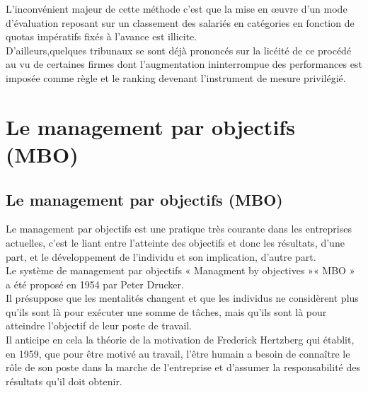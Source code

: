 L’inconvénient majeur de cette méthode c’est que la mise en œuvre d'un mode d'évaluation reposant sur un classement des salariés en catégories en fonction de quotas impératifs fixés à l'avance est illicite.\\

D'ailleurs,quelques tribunaux se sont déjà prononcés sur la licéité de ce procédé au vu de  certaines firmes dont l'augmentation ininterrompue des performances est imposée comme   règle et le ranking  devenant l'instrument de mesure privilégié.

\section{Le management par objectifs (MBO)}
\subsection{Le management par objectifs (MBO)}
Le management par objectifs est une pratique très courante dans les entreprises actuelles, c’est le liant entre l'atteinte des objectifs et donc les résultats, d'une part, et le développement de l'individu et son implication, d'autre part.\\
Le système de management par objectifs « Managment by objectives »« MBO » a été proposé en 1954 par Peter Drucker.\\ 
Il présuppose que les mentalités changent et que les individus ne considèrent plus qu’ils sont là pour exécuter une somme de tâches, mais qu’ils sont là pour atteindre l’objectif de leur poste de travail.\\ 
Il anticipe en cela la théorie de la motivation de Frederick Hertzberg qui établit, en 1959, que pour être motivé au travail, l’être humain a besoin de connaître le rôle de son poste dans la marche de l’entreprise et d’assumer la responsabilité des résultats qu’il doit obtenir.

